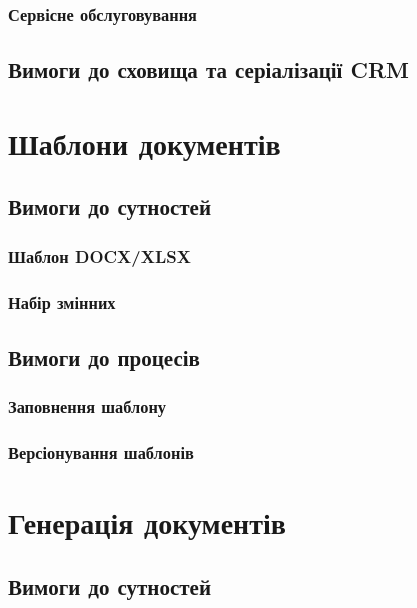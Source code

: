 \subsubsection{Сервісне обслуговування}

\subsection{Вимоги до сховища та серіалізації CRM}

\newpage
\section{Шаблони документів}

\subsection{Вимоги до сутностей}

\subsubsection{Шаблон DOCX/XLSX}

\subsubsection{Набір змінних}

\subsection{Вимоги до процесів}

\subsubsection{Заповнення шаблону}

\subsubsection{Версіонування шаблонів}

\newpage
\section{Генерація документів}

\subsection{Вимоги до сутностей}

